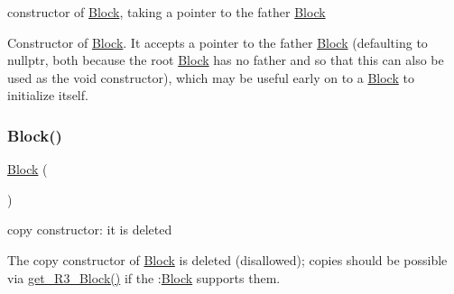 constructor of \mbox{\hyperlink{class_s_m_spp__di__unipi__it_1_1_block}{Block}}, taking a pointer to the father \mbox{\hyperlink{class_s_m_spp__di__unipi__it_1_1_block}{Block}} 

Constructor of \mbox{\hyperlink{class_s_m_spp__di__unipi__it_1_1_block}{Block}}. It accepts a pointer to the father \mbox{\hyperlink{class_s_m_spp__di__unipi__it_1_1_block}{Block}} (defaulting to nullptr, both because the root \mbox{\hyperlink{class_s_m_spp__di__unipi__it_1_1_block}{Block}} has no father and so that this can also be used as the void constructor), which may be useful early on to a \mbox{\hyperlink{class_s_m_spp__di__unipi__it_1_1_block}{Block}} to initialize itself. \mbox{\label{class_s_m_spp__di__unipi__it_1_1_block_a0c41139a69c97e5a3a6d2953444e8ef8}} 
\subsubsection{\texorpdfstring{Block()}{Block()}\hspace{0.1cm}{\footnotesize\ttfamily [2/2]}}
{\footnotesize\ttfamily \mbox{\hyperlink{class_s_m_spp__di__unipi__it_1_1_block}{Block}} (\begin{DoxyParamCaption}\item[{const \mbox{\hyperlink{class_s_m_spp__di__unipi__it_1_1_block}{Block}} \&}]{ }\end{DoxyParamCaption})\hspace{0.3cm}{\ttfamily [delete]}}



copy constructor\+: it is deleted 

The copy constructor of \mbox{\hyperlink{class_s_m_spp__di__unipi__it_1_1_block}{Block}} is deleted (disallowed); copies should be possible via \mbox{\hyperlink{class_s_m_spp__di__unipi__it_1_1_block_a2e682f5c0d4a74503c0cb5ab38fb6428}{get\+\_\+\+R3\+\_\+\+Block()}} if the \+:\mbox{\hyperlink{class_s_m_spp__di__unipi__it_1_1_block}{Block}} supports them. \mbox{\label{class_s_m_spp__di__unipi__it_1_1_block_a36ecbe6284a6256224aba407cfabc5e6}} 
